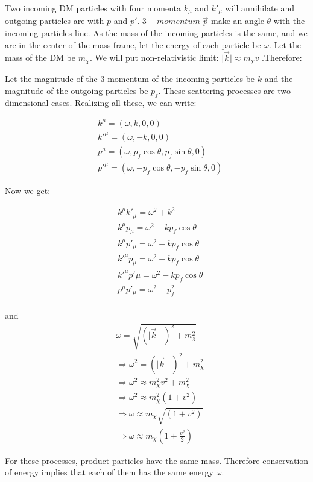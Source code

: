 \documentclass[12pt]{report}
\begin{document}
Two incoming DM particles with four momenta $k_\mu$ and $k\prime_\mu$ will annihilate and outgoing particles are with $p$ and $p\prime$. $3-momentum\; \vec{p}$ make an angle $\theta$ with the incoming particles line. As the mass of the incoming particles is the same, and we are in the center of the mass frame, let the energy of each particle be $\omega$. Let the mass of the DM be $m_\chi$. We will put non-relativistic limit: $\mid \vec{k} \mid \approx m_\chi v$
 .Therefore:

Let the magnitude of the 3-momentum of the incoming particles be $k$ and the magnitude of the outgoing particles be $p_f$. These scattering processes are two-dimensional cases. Realizing all these, we can write:


\begin{align*}
&k^\mu=(\omega,k,0,0)\\
&k\prime^\mu =(\omega,-k,0,0)\\
&p^\mu =(\omega,p_f \cos\theta, p_f \sin\theta,0)\\
&p\prime^\mu =(\omega,-p_f \cos\theta, -p_f \sin\theta,0)
\end{align*}

Now we get:

\begin{align*}
&k^\mu k\prime_\mu = \omega^2+k^2\\
&k^\mu p_\mu = \omega^2-kp_f \cos\theta\\
&k^\mu p\prime_\mu = \omega^2 + kp_f \cos\theta\\
&k\prime^\mu p_\mu = \omega^2 + kp_f \cos\theta\\
&k\prime^\mu p\prime\mu = \omega^2-kp_f \cos\theta\\
&p^\mu p\prime_\mu =\omega^2+p_f^2
\end{align*}\\
and
\begin{eqnarray}
&\omega = \sqrt{(\mid \vec{k} \mid)^2 + m_\chi^2}\\
&\Rightarrow \omega^2 =(\mid \vec{k} \mid)^2 + m_\chi^2\\
&\Rightarrow \omega^2 \approx m_\chi^2 v^2 + m_\chi^2\\
&\Rightarrow \omega^2 \approx m_\chi^2 (1+v^2)\\
&\Rightarrow \omega \approx m_\chi \sqrt{(1+v^2)}\\
&\Rightarrow \omega \approx m_\chi (1+\frac{v^2}{2})
\end{eqnarray}

For these processes, product particles have the same mass. Therefore conservation of energy implies that each of them has the same energy $\omega$.
\end{document}
